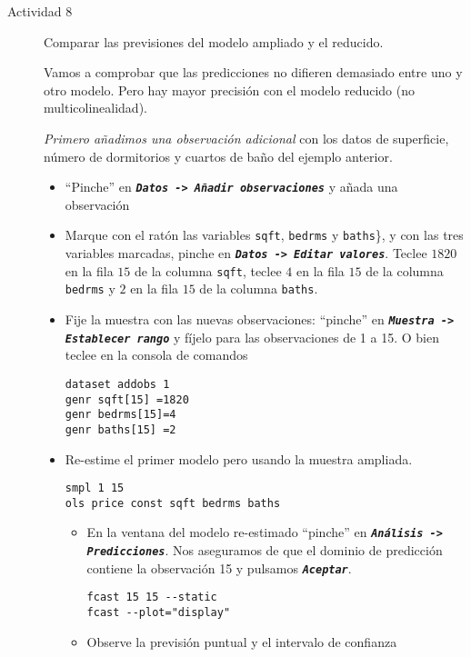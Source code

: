 \documentclass[11pt]{article}
\begin{document}
\begin{description}
\item[{Actividad 8}] Comparar las previsiones del modelo ampliado y el
reducido.

Vamos a comprobar que las predicciones no difieren demasiado entre
uno y otro modelo. Pero hay mayor precisión con el modelo reducido
(no multicolinealidad).

\emph{Primero añadimos una observación adicional} con los datos de
superficie, número de dormitorios y cuartos de baño del ejemplo
anterior.
\begin{itemize}
\item ``Pinche'' en \textbf{\emph{\texttt{Datos -> Añadir observaciones}}} y añada una observación

\item Marque con el ratón las variables \texttt{sqft},
\texttt{bedrms} y \texttt{baths}\}, y con las tres variables
marcadas, pinche en \textbf{\emph{\texttt{Datos -> Editar valores}}}. Teclee \(1820\)
en la fila \(15\) de la columna \texttt{sqft}, teclee \(4\) en la fila
\(15\) de la columna \texttt{bedrms} y \(2\) en la fila \(15\) de la columna
\texttt{baths}.

\item Fije la muestra con las nuevas observaciones: ``pinche'' en
\textbf{\emph{\texttt{Muestra -> Establecer rango}}} y fíjelo para las observaciones
de 1 a 15.  O bien teclee en la  consola de comandos
\begin{verbatim}
dataset addobs 1
genr sqft[15] =1820
genr bedrms[15]=4
genr baths[15] =2
\end{verbatim}

\item Re-estime el primer modelo pero usando la muestra ampliada.
\begin{verbatim}
smpl 1 15
ols price const sqft bedrms baths
\end{verbatim}

\begin{itemize}
\item En la ventana del modelo re-estimado ``pinche'' en \textbf{\emph{\texttt{Análisis
      -> Predicciones}}}. Nos aseguramos de que el dominio de
predicción contiene la observación 15 y pulsamos \textbf{\emph{\texttt{Aceptar}}}.
\begin{verbatim}
fcast 15 15 --static
fcast --plot="display"
\end{verbatim}

\item Observe la previsión puntual y el intervalo de confianza
\end{itemize}


\end{itemize}
\end{description}
\end{document}

